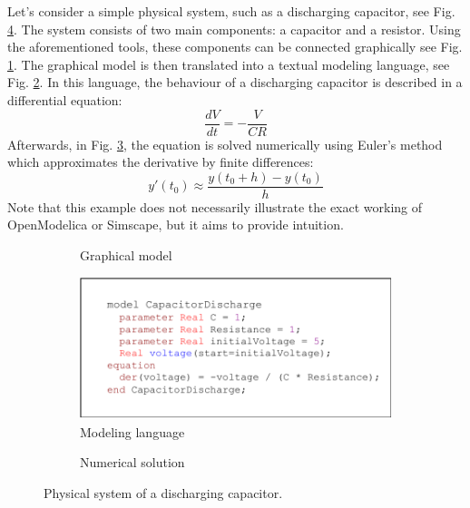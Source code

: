 \documentclass[conference]{IEEEtran}
\begin{document}
Let's consider a simple physical system, such as a discharging capacitor, see Fig. \ref{capacitor-discharge}.
The system consists of two main components: a capacitor and a resistor.
Using the aforementioned tools, these components can be connected graphically see Fig. \ref{cd:graphical-model}.
The graphical model is then translated into a textual modeling language, see Fig. \ref{cd:modeling-language}.
In this language, the behaviour of a discharging capacitor is described in a differential equation:
\[
\frac{dV}{dt} = -\frac{V}{CR}
\]
Afterwards, in Fig. \ref{cd:numerical-solution}, the equation is solved numerically using Euler's method which approximates the derivative by finite differences:
\[
y'(t_0) \approx \frac{y(t_0+h) - y(t_0)}{h}
\]
Note that this example does not necessarily illustrate the exact working of OpenModelica or Simscape, but it aims to provide intuition.

\begin{figure}[htbp]
  \centering
  \begin{subfigure}[b]{\linewidth}
    \centering
    
    \caption{Graphical model}
    \label{cd:graphical-model}
  \end{subfigure}
  
  \vspace{1em}
  
  \begin{subfigure}[b]{\linewidth}
    \centering
    \includegraphics[width=0.9\linewidth]{images/capacitor-discharge-code.drawio.pdf}
    \caption{Modeling language}
    \label{cd:modeling-language}
  \end{subfigure}
  
  \vspace{1em}
  
  \begin{subfigure}[b]{\linewidth}
    \centering
    
    \caption{Numerical solution}
    \label{cd:numerical-solution}
  \end{subfigure}
  
  \caption{Physical system of a discharging capacitor.}
  \label{capacitor-discharge}
\end{figure}
\end{document}
